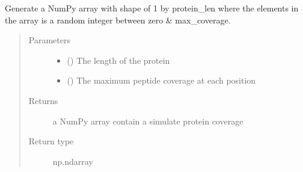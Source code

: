 \documentclass[letterpaper,10pt,english]{sphinxmanual}
\begin{document}
\begin{fulllineitems}
\label{\detokenize{IPTK.Utils:IPTK.Utils.UtilityFunction.generate_random_protein_mapping}}
Generate a NumPy array with shape of 1 by protein\_len where the elements in the array 
is a random integer between zero \&  max\_coverage.
\begin{quote}\begin{description}
\item[{Parameters}] \leavevmode\begin{itemize}
\item {} 
 () \textendash{} The length of the protein

\item {} 
 () \textendash{} The maximum peptide coverage at each position

\end{itemize}

\item[{Returns}] \leavevmode
a NumPy array contain a simulate protein coverage

\item[{Return type}] \leavevmode
np.ndarray

\end{description}\end{quote}

\end{fulllineitems}

\end{document}
